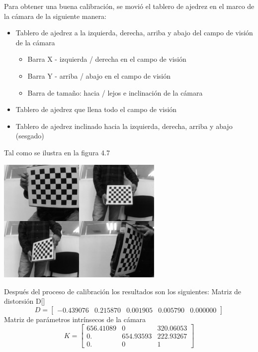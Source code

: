 Para obtener una buena calibración, se movió el tablero de ajedrez en el marco de la cámara de
la siguiente manera:
\begin{itemize}
	\item Tablero de ajedrez a la izquierda, derecha, arriba y abajo del campo de visión de la cámara
	      \begin{itemize}
		      \item Barra X - izquierda / derecha en el campo de visión
		      \item Barra Y - arriba / abajo en el campo de visión
		      \item Barra de tamaño: hacia / lejos e inclinación de la cámara
	      \end{itemize}
	\item Tablero de ajedrez que llena todo el campo de visión
	\item Tablero de ajedrez inclinado hacia la izquierda, derecha, arriba y abajo (sesgado)
\end{itemize}
Tal como se ilustra en la figura 4.7
\begin{center}
	\includegraphics[width=0.6\textwidth]{Contenido/Cuerpo/Capitulo4/Fig12.eps}
	\label{Fig1}
\end{center}
Después del proceso de calibración los resultados son los siguientes:
Matriz de distorsión D[]
\begin{equation}
	D=
	\begin{bmatrix}
		-0.439076 & 0.215870 & 0.001905 & 0.005790 & 0.000000
	\end{bmatrix}
\end{equation}
Matriz de parámetros intrínsecos de la cámara
\begin{equation}
	K=
	\begin{bmatrix}
		656.41089 & 0         & 320.06053 \\
		0.        & 654.93593 & 222.93267 \\
		0.        & 0         & 1
	\end{bmatrix}
\end{equation}

